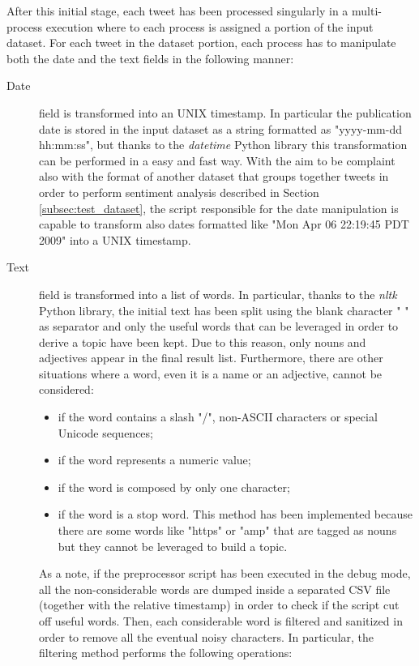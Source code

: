 After this initial stage, each tweet has been processed singularly in a multi-process execution where to each process is assigned a portion of the input dataset. For each tweet in the dataset portion, each process has to manipulate both the date and the text fields in the following manner:
\begin{description}
	\item[Date] field is transformed into an UNIX timestamp. In particular the publication date is stored in the input dataset as a string formatted as "yyyy-mm-dd hh:mm:ss", but thanks to the \textit{datetime} Python library this transformation can be performed in a easy and fast way. With the aim to be complaint also with the format of another dataset that groups together tweets in order to perform sentiment analysis \cite{sentiment-analysis-dataset} described in Section \ref{subsec:test_dataset}, the script responsible for the date manipulation is capable to transform also dates formatted like "Mon Apr 06 22:19:45 PDT 2009" into a UNIX timestamp.
	\item[Text] field is transformed into a list of words. In particular, thanks to the \textit{nltk} \cite{python-nltk} Python library, the initial text has been split using the blank character " " as separator and only the useful words that can be leveraged in order to derive a topic have been kept. Due to this reason, only nouns and adjectives appear in the final result list. Furthermore, there are other situations where a word, even it is a name or an adjective, cannot be considered: 
	\begin{itemize}
		\item if the word contains a slash "/", non-ASCII characters or special Unicode sequences;
		\item if the word represents a numeric value;
		\item if the word is composed by only one character;
		\item if the word is a stop word. This method has been implemented because there are some words like "https" or "amp" that are tagged as nouns but they cannot be leveraged to build a topic.
	\end{itemize}
	As a note, if the preprocessor script has been executed in the debug mode, all the non-considerable words are dumped inside a separated CSV file (together with the relative timestamp) in order to check if the script cut off useful words. Then, each considerable word is filtered and sanitized in order to remove all the eventual noisy characters. In particular, the filtering method performs the following operations:

\end{description}
